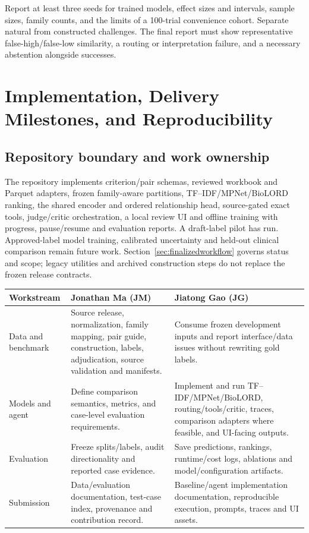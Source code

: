 \documentclass[10pt,letterpaper]{article}
\begin{document}
Report at least three seeds for trained models, effect sizes and intervals,
sample sizes, family counts, and the limits of a 100-trial convenience cohort.
Separate natural from constructed challenges. The final report must show
representative false-high/false-low similarity, a routing or interpretation
failure, and a necessary abstention alongside successes.

\appendix
\section{Implementation, Delivery Milestones, and Reproducibility}
\label{sec:delivery}

\subsection{Repository boundary and work ownership}
The repository implements criterion/pair schemas, reviewed workbook and
Parquet adapters, frozen family-aware partitions, TF--IDF/MPNet/BioLORD
ranking, the shared encoder and ordered relationship head, source-gated exact
tools, judge/critic orchestration, a local review UI and offline training with
progress, pause/resume and evaluation reports. A draft-label pilot has run.
Approved-label model training, calibrated uncertainty and held-out clinical
comparison remain future work. Section~\ref{sec:finalizedworkflow} governs
status and scope; legacy utilities and archived construction steps do not
replace the frozen release contracts.

\begin{longtable}{L{.20\linewidth}L{.35\linewidth}L{.36\linewidth}}
\toprule Workstream & Jonathan Ma (JM) & Jiatong Gao (JG)\\\midrule
\endhead
Data and benchmark & Source release, normalization, family mapping, pair guide, construction, labels, adjudication, source validation and manifests. & Consume frozen development inputs and report interface/data issues without rewriting gold labels.\\
Models and agent & Define comparison semantics, metrics, and case-level evaluation requirements. & Implement and run TF--IDF/MPNet/BioLORD, routing/tools/critic, traces, comparison adapters where feasible, and UI-facing outputs.\\
Evaluation & Freeze splits/labels, audit directionality and reported case evidence. & Save predictions, rankings, runtime/cost logs, ablations and model/configuration artifacts.\\
Submission & Data/evaluation documentation, test-case index, provenance and contribution record. & Baseline/agent implementation documentation, reproducible execution, prompts, traces and UI assets.\\\bottomrule
\end{longtable}
\end{document}
